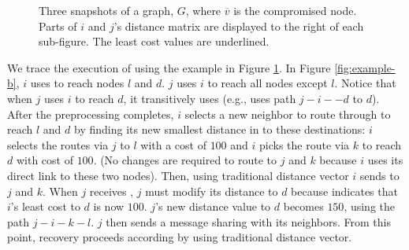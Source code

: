 \begin{figure}[t]
\begin{center}
  \end{center}
	\caption{Three snapshots of a graph, $G$, where $\overline{v}$ is the compromised node. Parts of $i$ and $j$'s distance matrix are displayed to the right of each sub-figure.
	The least cost values are underlined.}
  \label{fig:dv-example}
\end{figure}


We trace the execution of \second using the example in Figure \ref{fig:dv-example}.
In Figure \ref{fig:example-b}, $i$ uses \bad to reach nodes $l$ and $d$.  $j$ uses $i$ to reach all nodes except $l$.  Notice that when $j$ uses $i$ to reach $d$, 
it transitively uses \badvector (e.g., uses path $j-i-$\bads$-d$ to $d$). 
After the preprocessing completes, $i$ selects a new neighbor to route through to reach $l$ and $d$ by finding its new smallest distance in \dmatrixi 
to these destinations: $i$ selects the routes via $j$ to $l$ with a cost of $100$ and $i$ picks the route via $k$ to reach $d$ with cost of $100$. 
(No changes are required to route to $j$ and $k$ because $i$ uses its direct link to these two nodes). 
Then, using traditional distance vector $i$ sends \minvi to $j$ and $k$.  When $j$ receives \minvis, $j$ must modify its distance to $d$ because \minvi indicates 
that $i$'s least cost to $d$ is now $100$.
$j$'s new distance value to $d$ becomes $150$, using the path $j-i-k-l$. $j$ then sends a message sharing \minvj with its neighbors.  From this point, recovery proceeds according 
by using traditional distance vector. 

